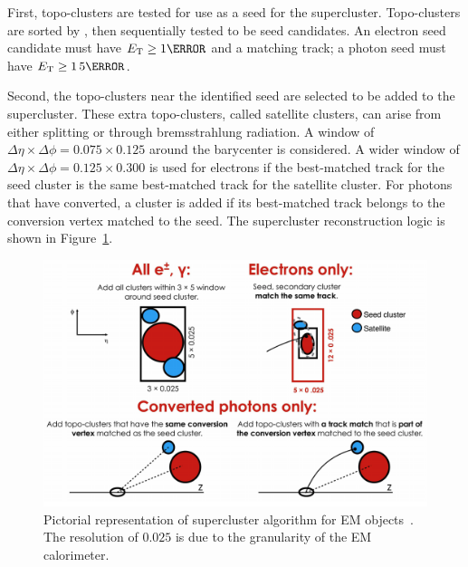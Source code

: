 First, topo-clusters are tested for use as a seed for the supercluster. Topo-clusters are sorted by \et, then sequentially tested to be seed candidates. An electron seed candidate must have $\et \geq \unit{1}{\GeV}$ and a matching track; a photon seed must have $\et \geq \unit{1.5}{\GeV}$. 

Second, the topo-clusters near the identified seed are selected to be added to the supercluster. These extra topo-clusters, called satellite clusters, can arise from either splitting or through bremsstrahlung radiation. A window of $\Delta \eta \times \Delta \phi = 0.075 \times 0.125$ around the barycenter is considered. A wider window of $\Delta \eta \times \Delta \phi = 0.125 \times 0.300$ is used for electrons if the best-matched track for the seed cluster is the same best-matched track for the satellite cluster. For photons that have converted, a cluster is added if its best-matched track belongs to the conversion vertex matched to the seed. The supercluster reconstruction logic is shown in Figure~\ref{fig:supercluster-reco}.

\begin{figure}[h]
    \centering
    \includegraphics[width=.90\textwidth]{chapters/chapter3_eventreco/images/supercluster-formation.png}
    \caption[Pictorial representation of supercluster algorithm for \gls{EM} objects]{Pictorial representation of supercluster algorithm for \gls{EM} objects~\cite{photon-electron-perf}. The resolution of $0.025$ is due to the granularity of the \gls{EM} calorimeter.}
    \label{fig:supercluster-reco}
\end{figure}



